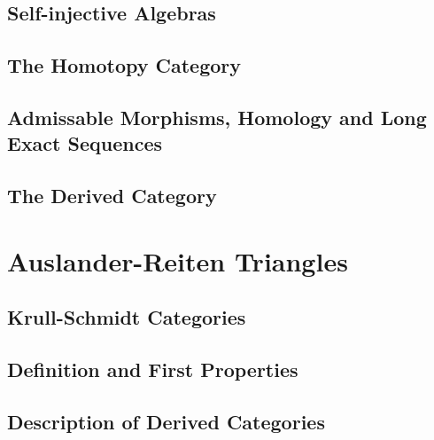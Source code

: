 \documentclass[12pt]{article}
\theoremstyle{definition}
\theoremstyle{remark}
\begin{document}
        \subsection{Self-injective Algebras}

        \subsection{The Homotopy Category}

        \subsection{Admissable Morphisms, Homology and Long Exact Sequences}

        \subsection{The Derived Category}

    \clearpage
    
    \section{Auslander-Reiten Triangles}

        \subsection{Krull-Schmidt Categories}

        \subsection{Definition and First Properties}

        \subsection{Description of Derived Categories}

    \clearpage

    \nocite{*}
    
    

    \clearpage


\end{document}
